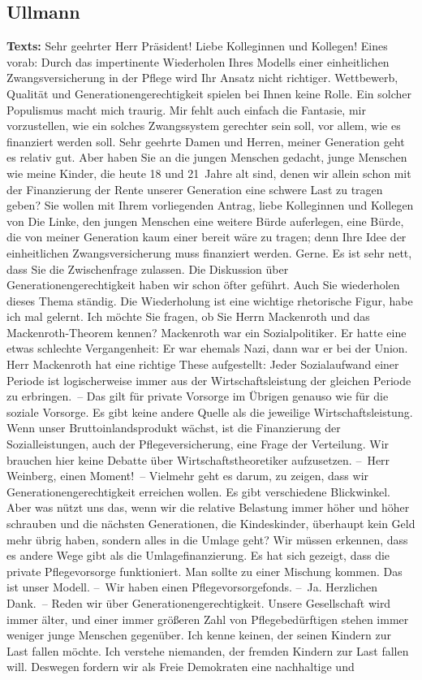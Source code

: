 \documentclass{article}
\begin{document}
\subsection{Ullmann}
\noindent\textbf{Texts:} Sehr geehrter Herr Präsident! Liebe Kolleginnen und Kollegen! Eines vorab: Durch das impertinente Wiederholen Ihres Modells einer einheitlichen Zwangsversicherung in der Pflege wird Ihr Ansatz nicht richtiger. Wettbewerb, Qualität und Generationengerechtigkeit spielen bei Ihnen keine Rolle.  Ein solcher Populismus macht mich traurig. Mir fehlt auch einfach die Fantasie, mir vorzustellen, wie ein solches Zwangssystem gerechter sein soll, vor allem, wie es finanziert werden soll.  Sehr geehrte Damen und Herren, meiner Generation geht es relativ gut. Aber haben Sie an die jungen Menschen gedacht, junge Menschen wie meine Kinder, die heute 18 und 21 Jahre alt sind, denen wir allein schon mit der Finanzierung der Rente unserer Generation eine schwere Last zu tragen geben?  Sie wollen mit Ihrem vorliegenden Antrag, liebe Kolleginnen und Kollegen von Die Linke, den jungen Menschen eine weitere Bürde auferlegen,  eine Bürde, die von meiner Generation kaum einer bereit wäre zu tragen; denn Ihre Idee der einheitlichen Zwangsversicherung muss finanziert werden. Gerne. Es ist sehr nett, dass Sie die Zwischenfrage zulassen. Die Diskussion über Generationengerechtigkeit haben wir schon öfter geführt. Auch Sie wiederholen dieses Thema ständig. Die Wiederholung ist eine wichtige rhetorische Figur, habe ich mal gelernt. Ich möchte Sie fragen, ob Sie Herrn Mackenroth und das Mackenroth-Theorem kennen? Mackenroth war ein Sozialpolitiker. Er hatte eine etwas schlechte Vergangenheit: Er war ehemals Nazi, dann war er bei der Union. Herr Mackenroth hat eine richtige These aufgestellt: Jeder Sozialaufwand einer Periode ist logischerweise immer aus der Wirtschaftsleistung der gleichen Periode zu erbringen. – Das gilt für private Vorsorge im Übrigen genauso wie für die soziale Vorsorge. Es gibt keine andere Quelle als die jeweilige Wirtschaftsleistung. Wenn unser Bruttoinlandsprodukt wächst, ist die Finanzierung der Sozialleistungen, auch der Pflegeversicherung, eine Frage der Verteilung.  Wir brauchen hier keine Debatte über Wirtschaftstheoretiker aufzusetzen.  – Herr Weinberg, einen Moment! – Vielmehr geht es darum, zu zeigen, dass wir Generationengerechtigkeit erreichen wollen. Es gibt verschiedene Blickwinkel. Aber was nützt uns das, wenn wir die relative Belastung immer höher und höher schrauben und die nächsten Generationen, die Kindeskinder, überhaupt kein Geld mehr übrig haben, sondern alles in die Umlage geht? Wir müssen erkennen, dass es andere Wege gibt als die Umlagefinanzierung.  Es hat sich gezeigt, dass die private Pflegevorsorge funktioniert. Man sollte zu einer Mischung kommen. Das ist unser Modell.  – Wir haben einen Pflegevorsorgefonds.  – Ja. Herzlichen Dank. – Reden wir über Generationengerechtigkeit. Unsere Gesellschaft wird immer älter, und einer immer größeren Zahl von Pflegebedürftigen stehen immer weniger junge Menschen gegenüber. Ich kenne keinen, der seinen Kindern zur Last fallen möchte. Ich verstehe niemanden, der fremden Kindern zur Last fallen will. Deswegen fordern wir als Freie Demokraten eine nachhaltige und 
\end{document}
